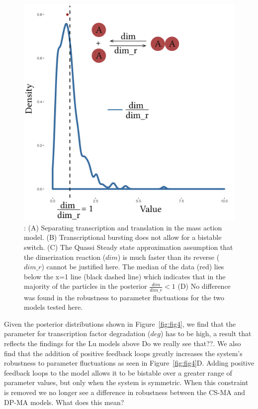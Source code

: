 {\begin{figure}[htbp]
\begin{center}
\includegraphics[scale=0.4]{chapterStabilityFinder/images/MA_QSSA.png}
\caption[LoF caption]{ \label{fig:fig5}: (A) Separating transcription and translation in the mass action model. (B) Transcriptional bursting does not allow for a bistable switch. (C) The Quassi Steady state approximation assumption that the dimerization reaction ($dim$) is much faster than its reverse ($dim\_r$) cannot be justified here. The median of the data (red) lies below the x=1 line (black dashed line) which indicates that in the majority of the particles in the posterior $\frac{dim}{dim\_r} < 1$  (D) No difference was found in the robustness to parameter fluctuations for the two models tested here.}
\end{center}
\end{figure}
\clearpage


Given the posterior distributions shown in Figure~\ref{fig:fig4}, we find that the parameter for transcription factor degradation ($deg$) has to be high, a result that reflects the findings for the Lu models above {\color{red} Do we really see that??}. We also find that the addition of positive feedback loops greatly increases the system's robustness to parameter fluctuations as seen in Figure~\ref{fig:fig4}D. Adding positive feedback loops to the model allows it to be bistable over a greater range of parameter values, but only when the system is symmetric. When this constraint is removed we no longer see a difference in robustness between the CS-MA and DP-MA models. {\color{red} What does this mean? }



}
